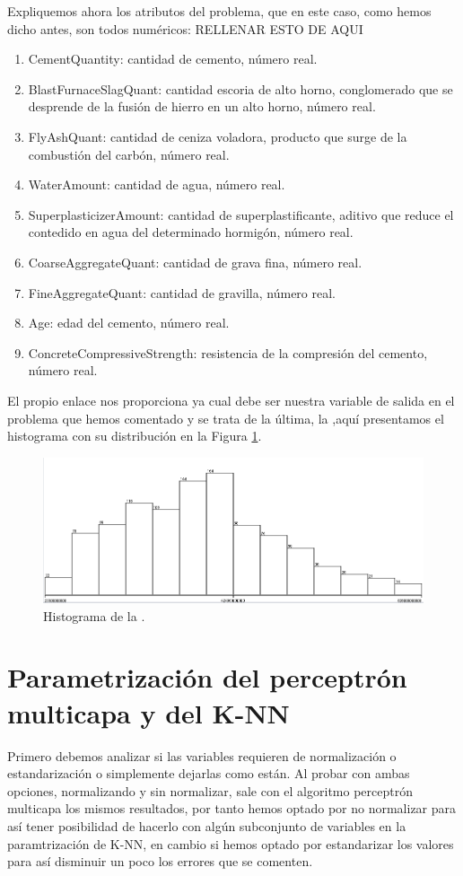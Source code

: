 \documentclass[a4paper, 11pt, twoside, openany, onecolumn, final]{memoir}
\begin{document}
	Expliquemos ahora los atributos del problema, que en este caso, como hemos dicho antes, son todos numéricos:
	RELLENAR ESTO DE AQUI
	\begin{enumerate}
\item CementQuantity: cantidad de cemento, número real.
\item BlastFurnaceSlagQuant: cantidad escoria de alto horno, conglomerado que se desprende de la fusión de hierro en un alto horno, número real.
\item FlyAshQuant: cantidad de ceniza voladora, producto que surge de la combustión del carbón, número real.
\item WaterAmount: cantidad de agua, número real.
\item SuperplasticizerAmount: cantidad de superplastificante, aditivo que reduce el contedido en agua del determinado hormigón, número real.
\item CoarseAggregateQuant: cantidad de grava fina, número real.
\item FineAggregateQuant: cantidad de gravilla, número real.
\item Age: edad del cemento, número real.
\item ConcreteCompressiveStrength: resistencia de la compresión del cemento, número real.
\end{enumerate}

	El propio enlace nos proporciona ya cual debe ser nuestra variable de salida en el problema que hemos comentado y se trata de la última, la ,aquí presentamos el histograma con su distribución en la Figura \ref{HistoVarSalidaRegre}.
	
	\begin{figure}
  		\centering
   	\includegraphics[width=1\textwidth]{Imagenes/HistogramaVarSalRegre}
  		\caption{Histograma de la .}
  		\label{HistoVarSalidaRegre}
	\end{figure}
	\section{Parametrización del perceptrón multicapa y del K-NN}
	Primero debemos analizar si las variables requieren de normalización o estandarización o simplemente dejarlas como están. Al probar con ambas opciones, normalizando y sin normalizar, sale con el algoritmo perceptrón multicapa los mismos resultados, por tanto hemos optado por no normalizar para así tener posibilidad de hacerlo con algún subconjunto de variables en la paramtrización de K-NN, en cambio si hemos optado por estandarizar los valores para así disminuir un poco los errores que se comenten.
	
\end{document}
